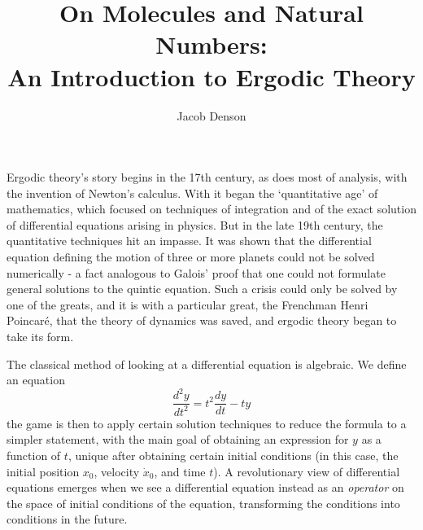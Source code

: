 \documentclass{article}
\title{On Molecules and Natural Numbers:\\
An Introduction to Ergodic Theory}
\author{Jacob Denson}
\theoremstyle{plain}
\theoremstyle{definition}
\begin{document}

\maketitle



Ergodic theory's story begins in the 17th century, as does most of analysis, with the invention of Newton's calculus. With it began the `quantitative age' of mathematics, which focused on techniques of integration and of the exact solution of differential equations arising in physics. But in the late 19th century, the quantitative techniques hit an impasse. It was shown that the differential equation defining the motion of three or more planets could not be solved numerically - a fact analogous to Galois' proof that one could not formulate general solutions to the quintic equation. Such a crisis could only be solved by one of the greats, and it is with a particular great, the Frenchman Henri Poincar\'{e}, that the theory of dynamics was saved, and ergodic theory began to take its form.

The classical method of looking at a differential equation is algebraic. We define an equation
%
\[ \frac{d^2 y}{dt^2} = t^2 \frac{dy}{dt} - ty \]
%
the game is then to apply certain solution techniques to reduce the formula to a simpler statement, with the main goal of obtaining an expression for $y$ as a function of $t$, unique after obtaining certain initial conditions (in this case, the initial position $x_0$, velocity $\dot{x}_0$, and time $t$). A revolutionary view of differential equations emerges when we see a differential equation instead as an {\it operator} on the space of initial conditions of the equation, transforming the conditions into conditions in the future.
\end{document}
